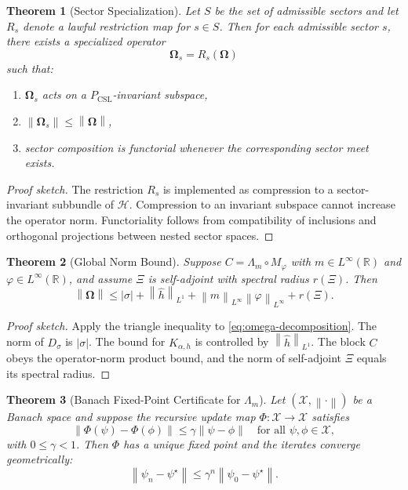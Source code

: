 \documentclass[11pt]{article}
\theoremstyle{plain}
\newtheorem{theorem}{Theorem}[section]
\theoremstyle{definition}
\theoremstyle{remark}
\newcommand{\Hbundle}{\mathcal{H}}
\newcommand{\R}{\mathbb{R}}
\newcommand{\Om}{\boldsymbol{\Omega}}
\newcommand{\PCSL}{P_{\mathrm{CSL}}}
\newcommand{\norm}[1]{\left\lVert #1 \right\rVert}
\begin{document}
\begin{theorem}[Sector Specialization]
Let \(S\) be the set of admissible sectors and let \(R_s\) denote a lawful restriction map for \(s \in S\). Then for each admissible sector \(s\), there exists a specialized operator
\[
\Om_s = R_s(\Om)
\]
such that:
\begin{enumerate}[label=(\roman*)]
    \item \(\Om_s\) acts on a \( \PCSL \)-invariant subspace,
    \item \(\norm{\Om_s} \le \norm{\Om}\),
    \item sector composition is functorial whenever the corresponding sector meet exists.
\end{enumerate}
\end{theorem}

\begin{proof}[Proof sketch]
The restriction \(R_s\) is implemented as compression to a sector-invariant subbundle of \(\Hbundle\). Compression to an invariant subspace cannot increase the operator norm. Functoriality follows from compatibility of inclusions and orthogonal projections between nested sector spaces.
\end{proof}

\begin{theorem}[Global Norm Bound]
Suppose \(C = \Lambda_m \circ M_\varphi\) with \(m \in L^\infty(\R)\) and \(\varphi \in L^\infty(\R)\), and assume \(\Xi\) is self-adjoint with spectral radius \(r(\Xi)\). Then
\begin{equation}
\norm{\Om}
\le
|\sigma| + \norm{\widehat{h}}_{L^1}
+ \norm{m}_{L^\infty}\norm{\varphi}_{L^\infty}
+ r(\Xi).
\label{eq:global-bound}
\end{equation}
\end{theorem}

\begin{proof}[Proof sketch]
Apply the triangle inequality to \eqref{eq:omega-decomposition}. The norm of \(D_\sigma\) is \(|\sigma|\). The bound for \(K_{\alpha,h}\) is controlled by \(\norm{\widehat{h}}_{L^1}\). The block \(C\) obeys the operator-norm product bound, and the norm of self-adjoint \(\Xi\) equals its spectral radius.
\end{proof}

\begin{theorem}[Banach Fixed-Point Certificate for \(\Lambda_m\)]
Let \((\mathcal{X},\norm{\cdot})\) be a Banach space and suppose the recursive update map \(\Phi:\mathcal{X}\to\mathcal{X}\) satisfies
\begin{equation}
\norm{\Phi(\psi)-\Phi(\phi)} \le \gamma \norm{\psi-\phi}
\quad\text{for all } \psi,\phi\in\mathcal{X},
\label{eq:banach-contract}
\end{equation}
with \(0\le \gamma <1\). Then \(\Phi\) has a unique fixed point and the iterates converge geometrically:
\begin{equation}
\norm{\psi_n-\psi^\star} \le \gamma^n \norm{\psi_0-\psi^\star}.
\label{eq:banach-geometric}
\end{equation}
\end{theorem}
\end{document}
